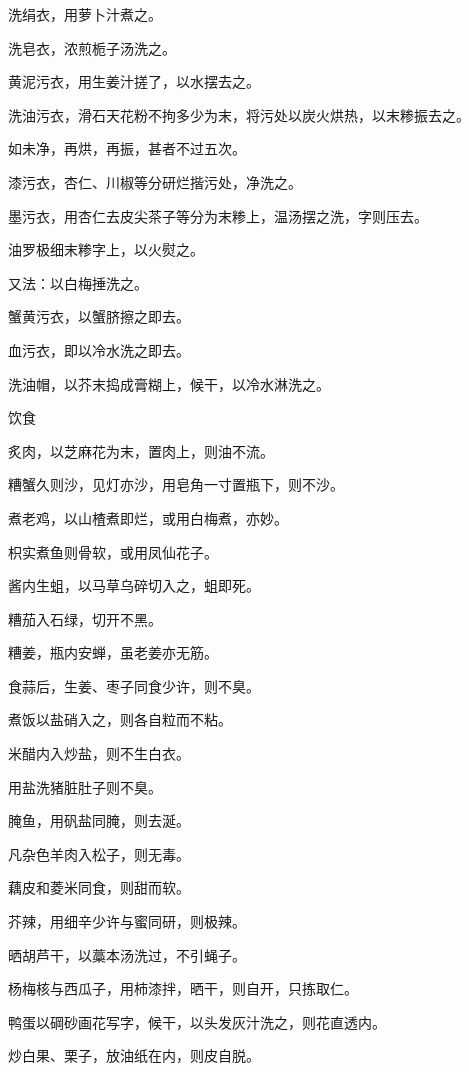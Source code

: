 \documentclass[a4paper,12pt,UTF8,twoside]{ctexbook}
\begin{document}
    洗绢衣，用萝卜汁煮之。
    
    洗皂衣，浓煎栀子汤洗之。
    
    黄泥污衣，用生姜汁搓了，以水摆去之。
    
    洗油污衣，滑石天花粉不拘多少为末，将污处以炭火烘热，以末糁振去之。
    
    如未净，再烘，再振，甚者不过五次。
    
    漆污衣，杏仁、川椒等分研烂揩污处，净洗之。
    
    墨污衣，用杏仁去皮尖茶子等分为末糁上，温汤摆之洗，字则压去。
    
    油罗极细末糁字上，以火熨之。
    
    又法：以白梅捶洗之。
    
    蟹黄污衣，以蟹脐擦之即去。
    
    血污衣，即以冷水洗之即去。
    
    洗油帽，以芥末捣成膏糊上，候干，以冷水淋洗之。
    
    饮食
    
    炙肉，以芝麻花为末，置肉上，则油不流。
    
    糟蟹久则沙，见灯亦沙，用皂角一寸置瓶下，则不沙。
    
    煮老鸡，以山楂煮即烂，或用白梅煮，亦妙。
    
    枳实煮鱼则骨软，或用凤仙花子。
    
    酱内生蛆，以马草乌碎切入之，蛆即死。
    
    糟茄入石绿，切开不黑。
    
    糟姜，瓶内安蝉，虽老姜亦无筋。
    
    食蒜后，生姜、枣子同食少许，则不臭。
    
    煮饭以盐硝入之，则各自粒而不粘。
    
    米醋内入炒盐，则不生白衣。
    
    用盐洗猪脏肚子则不臭。
    
    腌鱼，用矾盐同腌，则去涎。
    
    凡杂色羊肉入松子，则无毒。
    
    藕皮和菱米同食，则甜而软。
    
    芥辣，用细辛少许与蜜同研，则极辣。
    
    晒胡芦干，以藁本汤洗过，不引蝇子。
    
    杨梅核与西瓜子，用柿漆拌，晒干，则自开，只拣取仁。
    
    鸭蛋以碙砂画花写字，候干，以头发灰汁洗之，则花直透内。
    
    炒白果、栗子，放油纸在内，则皮自脱。
    
\end{document}
